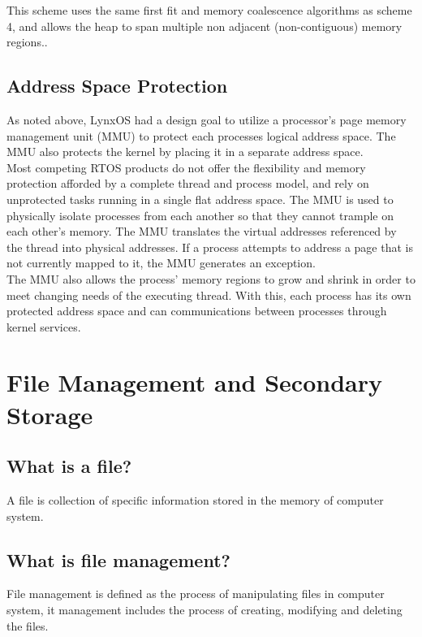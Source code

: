 \documentclass[12pt]{article}
\begin{document}
This scheme uses the same first fit and memory coalescence algorithms as scheme 4, and allows the heap to span multiple non adjacent (non-contiguous) memory regions..\\


\subsection{Address Space Protection}

As noted above, LynxOS had a design goal to utilize a processor's page memory
management unit (MMU) to protect each processes logical address space. The MMU also
protects the kernel by placing it in a separate address space.\\
Most competing RTOS products do not offer the flexibility and memory protection
afforded by a complete thread and process model, and rely on unprotected tasks running
in a single flat address space. 
The MMU is used to physically isolate processes from each another so that they cannot
trample on each other's memory. The MMU translates the virtual addresses referenced
by the thread into physical addresses. If a process attempts to address a page that is not
currently mapped to it, the MMU generates an exception.\\
The MMU also allows the process’ memory regions to grow and shrink in order to meet
changing needs of the executing thread. With this, each process has its own protected
address space and can communications between processes through kernel services.




\cleardoublepage

\section{File Management and Secondary Storage}

\subsection{What is a file?}
A file is collection of specific information stored in the memory of computer system.


\subsection{What is file management?}
File management is defined as the process of manipulating files in computer system, it management includes the process of creating, modifying and deleting the files.
\end{document}
